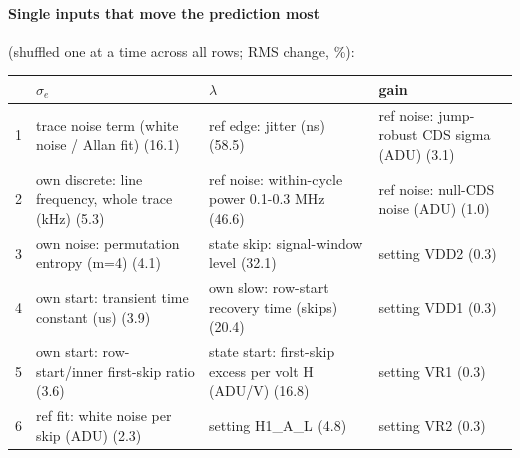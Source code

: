 \paragraph{Single inputs that move the prediction most} (shuffled one at a time across all rows; RMS change, \%):
\begin{center}\footnotesize
\begin{tabular}{rp{}p{}p{}}
\toprule
 & $\sigma_e$ & $\lambda$ & gain \\
\midrule
1 & trace noise term (white noise / Allan fit) (16.1) & ref edge: jitter (ns) (58.5) & ref noise: jump-robust CDS sigma (ADU) (3.1) \\
2 & own discrete: line frequency, whole trace (kHz) (5.3) & ref noise: within-cycle power 0.1-0.3 MHz (46.6) & ref noise: null-CDS noise (ADU) (1.0) \\
3 & own noise: permutation entropy (m=4) (4.1) & state skip: signal-window level (32.1) & setting VDD2 (0.3) \\
4 & own start: transient time constant (us) (3.9) & own slow: row-start recovery time (skips) (20.4) & setting VDD1 (0.3) \\
5 & own start: row-start/inner first-skip ratio (3.6) & state start: first-skip excess per volt H (ADU/V) (16.8) & setting VR1 (0.3) \\
6 & ref fit: white noise per skip (ADU) (2.3) & setting H1\_A\_L (4.8) & setting VR2 (0.3) \\
\bottomrule
\end{tabular}
\end{center}
